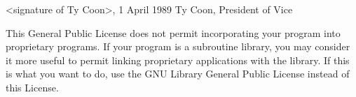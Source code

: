 \begin{DoxyCodeInclude}
  <signature of Ty Coon>, 1 April 1989
  Ty Coon, President of Vice

This General Public License does not permit incorporating your program into
proprietary programs.  If your program is a subroutine library, you may
consider it more useful to permit linking proprietary applications with the
library.  If \textcolor{keyword}{this} is what you want to \textcolor{keywordflow}{do}, use the GNU Library General
Public License instead of \textcolor{keyword}{this} License.
\end{DoxyCodeInclude}
 